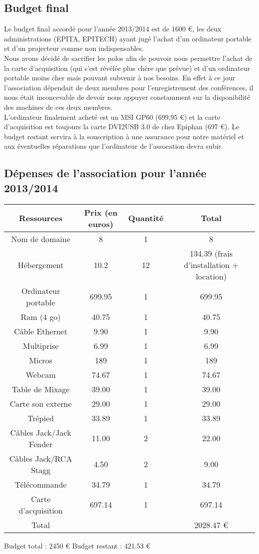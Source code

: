 \documentclass[12pt]{report}
\begin{document}
  \subsection{Budget final}
  Le budget final accordé pour l'année 2013/2014 est de 1600 \euro{}, les deux
  administrations (EPITA, EPITECH) ayant jugé l'achat d'un ordinateur portable
  et d'un projecteur comme non indispensables.\\ Nous avons décidé de sacrifier
  les polos afin de pouvoir nous permettre l'achat de la carte d'acquisition
  (qui s'est révélée plus chère que prévue) et d'un ordinateur portable moins
  cher mais pouvant subvenir à nos besoins. En effet à ce jour l'association
  dépendait de deux membres pour l'enregistrement des conférences, il nous
  était inconcevable de devoir nous appuyer constamment sur la disponibilité
  des machines de ces deux membres.\\ L'ordinateur finalement acheté est un MSI
  GP60 (699,95 \euro{}) et la carte d'acquisition est toujours la carte DVI2USB
  3.0 de chez Epiphan (697 \euro{}).
  \newline
  Le budget restant servira à la souscription à une assurance pour notre matériel
  et aux éventuelles réparations que l'ordinateur de l'assocation devra subir.
  \newpage
  \subsection{Dépenses de l'association pour l'année 2013/2014}
  \begin{tabular}{|c|c|c|c|}
          \hline
          Ressources & Prix (en euros) & Quantité & Total\\
          \hline
          Nom de domaine & 8 & 1 & 8\\
          Hébergement & 10.2 & 12 & 134.39 (frais d'installation + location)\\
          Ordinateur portable & 699.95 & 1 & 699.95\\
          Ram (4 go) & 40.75 & 1 & 40.75\\
          Câble Ethernet & 9.90 & 1 & 9.90\\
          Multiprise & 6.99 & 1 & 6.99\\
          Micros & 189 & 1 & 189\\
          Webcam & 74.67 & 1 & 74.67\\
          Table de Mixage & 39.00 & 1 & 39.00\\
          Carte son externe & 29.00 & 1 & 29.00\\
          Trépied & 33.89 & 1 & 33.89\\
          Câbles Jack/Jack Fender & 11.00 & 2 & 22.00\\
          Câbles Jack/RCA Stagg & 4.50 & 2 & 9.00\\
          Télécommande & 34.79 & 1 & 34.79\\
          Carte d'acquisition & 697.14 & 1 & 697.14\\
          \hline
          Total & & & 2028.47 \euro{}\\
          \hline
  \end{tabular}
  Budget total : 2450 \euro{}
  \newline
  Budget restant : 421.53 \euro{}
\end{document}
